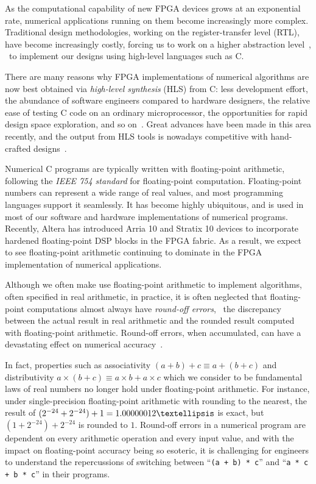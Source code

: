 As the computational capability of new FPGA devices grows at an exponential
rate, numerical applications running on them become increasingly more complex.
Traditional design methodologies, working on the register-transfer level (RTL),
have become increasingly costly, forcing us to work on a higher abstraction
level~\cite{gajski}, \ie~to implement our designs using high-level languages
such as C\@.

There are many reasons why FPGA implementations of numerical algorithms
are now best obtained via \emph{high-level synthesis} (HLS) from C\@:
less development effort, the abundance of software engineers compared to
hardware designers, the relative ease of testing C code on an ordinary
microprocessor, the opportunities for rapid design space exploration, and
so on~\cite{meeus12}. Great advances have been made in this area recently,
and the output from HLS tools is nowadays competitive with hand-crafted
designs~\cite{bdti_xilinx}.

Numerical C programs are typically written with floating-point arithmetic,
following the \emph{IEEE 754 standard} for floating-point computation.
Floating-point numbers can represent a wide range of real values, and most
programming languages support it seamlessly.  It has become highly ubiquitous,
and is used in most of our software and hardware implementations of numerical
programs.  Recently, Altera has introduced Arria 10 and Stratix 10 devices
to incorporate hardened floating-point DSP blocks in the FPGA fabric.  As a
result, we expect to see floating-point arithmetic continuing to dominate in
the FPGA implementation of numerical applications.

Although we often make use floating-point arithmetic to implement algorithms,
often specified in real arithmetic, in practice, it is often neglected that
floating-point computations almost always have \emph{round-off errors}, \ie~the
discrepancy between the actual result in real arithmetic and the rounded result
computed with floating-point arithmetic.  Round-off errors, when accumulated,
can have a devastating effect on numerical accuracy~\cite{higham02}.

In fact, properties such as associativity $(a + b) + c \equiv a + (b + c)$
and distributivity $a \times (b + c) \equiv a \times b + a \times c$ which
we consider to be fundamental laws of real numbers no longer hold under
floating-point arithmetic.  For instance, under single-precision floating-point
arithmetic with rounding to the nearest, the result of $(2^{-24} + 2^{-24})
+ 1 = 1.00000012\textellipsis$ is exact, but $(1 + 2^{-24}) + 2^{-24}$ is
rounded to $1$.  Round-off errors in a numerical program are dependent on
every arithmetic operation and every input value, and with the impact on
floating-point accuracy being so esoteric, it is challenging for engineers to
understand the repercussions of switching between ``\verb|(a + b) * c|'' and
``\verb|a * c + b * c|'' in their programs.

